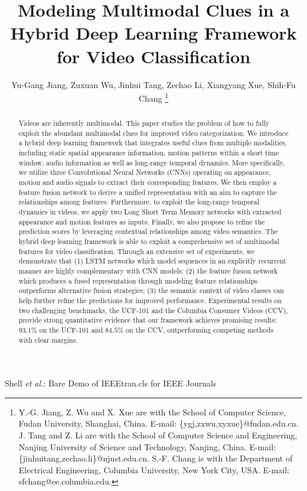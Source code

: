 \documentclass[journal]{IEEEtran}
\begin{document}
\title{Modeling Multimodal Clues in a Hybrid Deep Learning Framework for Video Classification}
\author{Yu-Gang Jiang, Zuxuan Wu, Jinhui Tang, Zechao Li, Xiangyang Xue, Shih-Fu Chang \thanks{Y.-G. Jiang, Z. Wu and X. Xue are with the School of Computer Science, Fudan University, Shanghai, China. E-mail: \{ygj,zxwu,xyxue\}@fudan.edu.cn. J. Tang and Z. Li are with the School of Computer Science and Engineering, Nanjing University of Science and Technology, Nanjing, China. E-mail: \{jinhuitang,zechao.li\}@njust.edu.cn. S.-F. Chang is with the Department of Electrical Engineering, Columbia University, New York City, USA. E-mail: sfchang@ee.columbia.edu. }}


%
{Shell \MakeLowercase{\textit{et al.}}: Bare Demo of IEEEtran.cls for IEEE Journals}

\maketitle

\begin{abstract}
Videos are inherently multimodal. This paper studies the problem of how to fully exploit the abundant multimodal clues for improved video categorization. We introduce a hybrid deep learning framework that integrates useful clues from multiple modalities, including static spatial appearance information, motion patterns within a short time window, audio information as well as long-range temporal dynamics. More specifically, we utilize three Convolutional Neural Networks (CNNs) operating on appearance, motion and audio signals to extract their corresponding features. We then employ a feature fusion network to derive a unified representation with an aim to capture the relationships among features. Furthermore, to exploit the long-range temporal dynamics in videos, we apply two Long Short Term Memory networks with extracted appearance and motion features as inputs. Finally, we also propose to refine the prediction scores by leveraging contextual relationships among video semantics. The hybrid deep learning framework is able to exploit a comprehensive set of multimodal features for video classification. Through an extensive set of experiments, we demonstrate that (1) LSTM networks which model sequences in an explicitly recurrent manner are highly complementary with CNN models; (2) the feature fusion network which produces a fused representation through modeling feature relationships outperforms alternative fusion strategies; (3) the semantic context of video classes can help further refine the predictions for improved performance. Experimental results on two challenging benchmarks, the UCF-101 and the Columbia Consumer Videos (CCV), provide strong quantitative evidence that our framework achieves promising results: $93.1\%$ on the UCF-101 and $84.5\%$ on the CCV, outperforming competing methods with clear margins.
\end{abstract}
\end{document}

